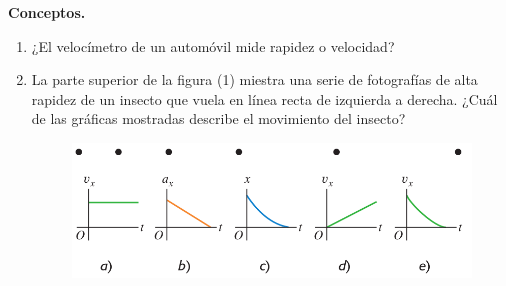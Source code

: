 \begin{mdframed}[style=warning]
	\begin{ejercicio}
		\textbf{Conceptos.}
		\begin{enumerate}
			\item ¿El velocímetro de un automóvil mide rapidez o velocidad?
			\item La parte superior de la figura (1) miestra una serie de fotografías de alta rapidez de un insecto que vuela en línea recta de izquierda a derecha. ¿Cuál de las gráficas mostradas describe el movimiento del insecto?
			 \begin{figure}[H]
			 	\centering
			 	\includegraphics[scale=0.3]{./img/mosca.png}
			 	\caption{}
			 	\label{mosca}
			 \end{figure}
		\end{enumerate}
	\end{ejercicio}
\end{mdframed}





